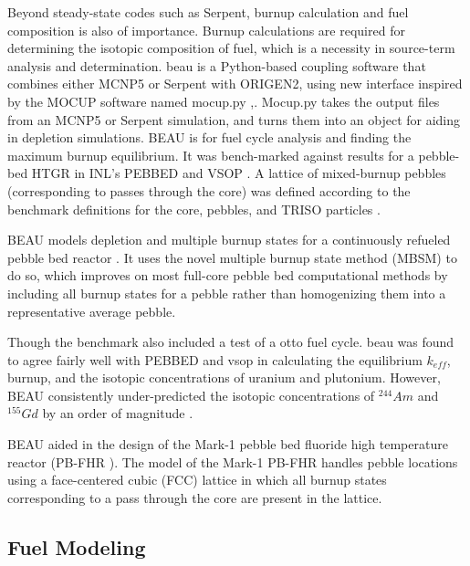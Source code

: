 Beyond steady-state codes such as Serpent, burnup calculation and fuel composition is also of importance.  Burnup calculations are required for determining the isotopic composition of fuel, which is a necessity in source-term analysis and determination. \acrfull{beau} is a Python-based coupling software that combines either MCNP5 or Serpent with ORIGEN2, using new interface inspired by the MOCUP software named mocup.py \cite{cisneros_pebble_2013},\cite{babcock_mocup_1995}.  Mocup.py takes the output files from an MCNP5 or Serpent simulation, and turns them into an object for aiding in depletion simulations.  BEAU is for fuel cycle analysis and finding the maximum burnup equilibrium.  It was bench-marked against results for a pebble-bed HTGR in INL's PEBBED and VSOP \cite{cisneros_pebble_2013}.  A lattice of mixed-burnup pebbles (corresponding to passes through the core) was defined according to the benchmark definitions for the core, pebbles, and TRISO particles \cite{cisneros_pebble_2013}.


BEAU models depletion and multiple burnup states for a continuously refueled pebble bed reactor \cite{cisneros_pebble_2013}. It uses the novel multiple burnup state method (MBSM) to do so, which improves on most full-core pebble bed computational methods by including all burnup states for a pebble rather than homogenizing them into a representative average pebble.


Though the benchmark also included a test of a \acrfull{otto} fuel cycle.  \acrshort{beau} was found to agree fairly well with PEBBED and \acrshort{vsop} in calculating the equilibrium $k_{eff}$, burnup, and the isotopic concentrations of uranium and plutonium.  However, BEAU consistently under-predicted the isotopic concentrations of $^{244}Am$ and $^{155}Gd$ by an order of magnitude \cite{cisneros_pebble_2013}.

BEAU aided in the design of the Mark-1 pebble bed fluoride high temperature reactor (PB-FHR \cite{cisneros_pebble_2013}).  The model of the Mark-1 PB-FHR handles pebble locations using a face-centered cubic (FCC) lattice in which all burnup states corresponding to a pass through the core are  present in the lattice.


\subsection{Fuel Modeling}

